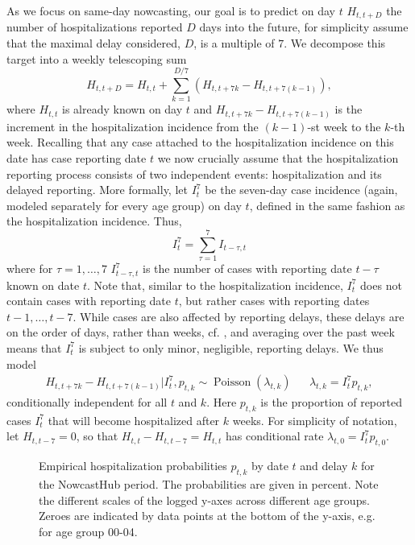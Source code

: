 As we focus on same-day nowcasting, our goal is to predict on day $t$ $H^{}_{t, t + D}$ the number of hospitalizations reported $D$ days into the future, for simplicity assume that the maximal delay considered, $D$, is a multiple of $7$. We decompose this target into a weekly telescoping sum 
$$
    H^{}_{t, t + D} = H^{}_{t, t} + \sum_{k = 1} ^{D / 7} (H^{}_{t, t + 7k} - H_{t, t + 7 ( k - 1)}),
$$
where $H_{t,t}$ is already known on day $t$ and $H_{t, t + 7k} - H_{t, t + 7 ( k - 1)}$ is the increment in the hospitalization incidence from the $(k-1)$-st week to the $k$-th week. Recalling that any case attached to the hospitalization incidence on this date has case reporting date $t$ we now crucially assume that the hospitalization reporting process consists of two independent events: hospitalization and its delayed reporting.
More formally, let $I^{7}_{t}$ be the seven-day case incidence (again, modeled separately for every age group) on day $t$, defined in the same fashion as the hospitalization incidence. Thus,
$$
    I^{7}_t = \sum_{\tau = 1}^{7} I^{}_{t - \tau, t}
$$
where for $\tau = 1, \dots, 7$ $I^{7}_{t - \tau, t}$ is the number of cases with reporting date $t - \tau$ known on date $t$. Note that, similar to the hospitalization incidence, $I^{7}_t$ does not contain cases with reporting date $t$, but rather cases with reporting dates $t - 1, \dots, t - 7$. While cases are also affected by reporting delays, these delays are on the order of days, rather than weeks, cf. , and averaging over the past week means that $I^{7}_t$ is subject to only minor, negligible, reporting delays. We thus model 
\begin{align}
    \label{eq:hosp_increment_distribution}
    H_{t, t + 7k} - H^{}_{t, t + 7 ( k - 1)} | I^{7}_t, p^{}_{t,k} \sim \operatorname{Poisson} \left( \lambda^{}_{t,k} \right) && \lambda^{}_{t,k} = I^{7}_{t} p^{}_{t,k},
\end{align}
conditionally independent for all $t$ and $k$.
Here $p^{}_{t,k}$ is the proportion of reported cases $I^{7}_{t}$ that will become hospitalized after $k$ weeks.
For simplicity of notation, let $H_{t, t - 7} = 0$, so that $H_{t,t} - H_{t, t- 7} = H_{t,t}$ has conditional rate $\lambda_{t,0} = I^{7}_t p_{t,0}$.

\begin{figure}
    \resizebox{\textwidth}{!}{%
    }
    \caption{Empirical hospitalization probabilities $\hat p_{t,k}$ by date $t$ and delay $k$ for the NowcastHub period. The probabilities are given in percent. Note the different scales of the logged y-axes across different age groups. Zeroes are indicated by data points at the bottom of the y-axis, e.g. for age group 00-04.}
    \label{fig:delay_hospitalization_probabilities}
\end{figure}

